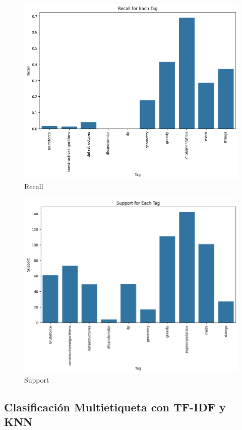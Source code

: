 \documentclass{article}
\begin{document}
\begin{figure}[H]
    \centering
    \includegraphics[scale=0.49]{imgs/recallnb.png}
    \caption{Recall}
    \label{fig:r}
\end{figure}
\begin{figure}[H]
    \centering
    \includegraphics[scale=0.49]{imgs/supportnb.png}
    \caption{Support}
    \label{fig:s}
\end{figure}

\subsection{Clasificación Multietiqueta con TF-IDF y KNN}
\end{document}
